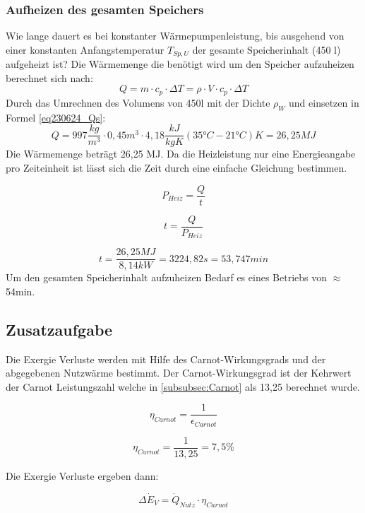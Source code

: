 \subsubsection{Aufheizen des gesamten Speichers}
Wie lange dauert es bei konstanter Wärmepumpenleistung, bis ausgehend von einer
konstanten Anfangstemperatur \texorpdfstring{$T_{Sp,U}$}{} der gesamte Speicherinhalt (450 l) aufgeheizt ist?
Die Wärmemenge die benötigt wird um den Speicher aufzuheizen berechnet sich nach:
\begin{equation}
Q = m \cdot c_p \cdot \Delta T = \rho \cdot V \cdot c_p \cdot \Delta T
\label{eq230624_Qs}
\end{equation}
Durch das Umrechnen des Volumens von 450l mit der Dichte $\rho_W$ und einsetzen in Formel \ref{eq230624_Qs}:
$$ Q = 997 \frac{kg}{m^3} \cdot 0,45 m^3 \cdot 4,18 \frac{kJ}{kg K} (35 \text{°} C-21 \text{°} C)K=26,25 MJ$$
Die Wärmemenge beträgt 26,25 MJ.
Da die Heizleistung nur eine Energieangabe pro Zeiteinheit ist lässt sich die Zeit durch eine einfache Gleichung bestimmen.

\begin{equation}
    P_{Heiz}= \frac{Q}{t}
\end{equation}

\begin{equation}
 t = \frac{Q}{P_{Heiz}}
\end{equation}

$$ t= \frac{26,25 MJ}{8,14 kW}=3224,82 s= 53,747 min$$
Um den gesamten Speicherinhalt aufzuheizen Bedarf es eines Betriebs von $\approx$ 54min.
\subsection{Zusatzaufgabe}

Die Exergie Verluste werden mit Hilfe des Carnot-Wirkungsgrads und der abgegebenen Nutzwärme bestimmt.
Der Carnot-Wirkungsgrad ist der Kehrwert der Carnot Leistungszahl welche in \autoref{subsubsec:Carnot} als 13,25 berechnet wurde.

\begin{equation}
    \eta_{Carnot}=\frac{1}{\epsilon_{Carnot}}
\end{equation}

$$\eta_{Carnot}=\frac{1}{13,25}= 7,5 \%$$

Die Exergie Verluste ergeben dann:

\begin{equation}
   \Delta \dot{E}_V= \dot{Q}_{Nutz} \cdot\eta_{Carnot}
\end{equation}

